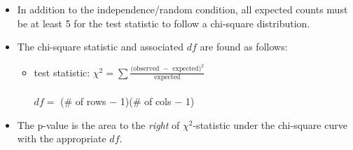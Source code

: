 \begin{itemize}
\item   In addition to the independence/random condition, all expected counts must be at least 5 for the test statistic to follow a chi-square distribution.  

\item The chi-square statistic and associated $df$ are found as follows:
\begin{itemize}
\item[] test statistic:  $\chi^2 =\sum{ \frac{\text{(observed } - \text{ expected})^2}{\text{expected}}}$\\
\\$df =$ (\# of rows $-$ 1)(\# of cols $-$ 1)
\end{itemize}
\item The p-value is the area to the \emph{right} of $\chi^2$-statistic under the chi-square curve with the appropriate $df$.
\end{itemize}


{}


\reviewchapterheader{}

